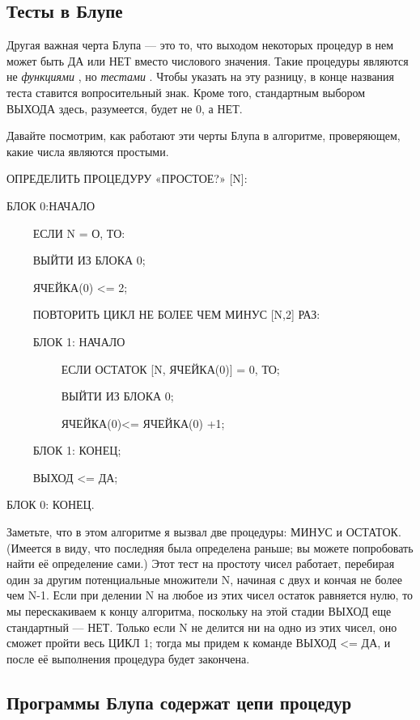 \documentclass[../main.tex]{subfiles}
\begin{document}
\subsection{Тесты в Блупе}

Другая важная черта Блупа --- это то, что выходом некоторых процедур в нем может быть ДА или НЕТ вместо числового значения. Такие процедуры являются не \emph{функциями} , но \emph{тестами} . Чтобы указать на эту разницу, в конце названия теста ставится вопросительный знак. Кроме того, стандартным выбором ВЫХОДА здесь, разумеется, будет не 0, а НЕТ.

Давайте посмотрим, как работают эти черты Блупа в алгоритме, проверяющем, какие числа являются простыми.

ОПРЕДЕЛИТЬ ПРОЦЕДУРУ «ПРОСТОЕ?» {[}N{]}:

БЛОК 0:НАЧАЛО

~~~~ ЕСЛИ N = О, ТО:

~~~~ ВЫЙТИ ИЗ БЛОКА 0;

~~~~ ЯЧЕЙКА(0) \textless= 2;

~~~~ ПОВТОРИТЬ ЦИКЛ НЕ БОЛЕЕ ЧЕМ МИНУС {[}N,2{]} РАЗ:

~~~~ БЛОК 1: НАЧАЛО

~~~~~~~~~ ЕСЛИ ОСТАТОК {[}N, ЯЧЕЙКА(0){]} = 0, ТО;

~~~~~~~~~ ВЫЙТИ ИЗ БЛОКА 0;

~~~~~~~~~ ЯЧЕЙКА(0)\textless= ЯЧЕЙКА(0) +1;

~~~~ БЛОК 1: КОНЕЦ;

~~~~ ВЫХОД \textless= ДА;

БЛОК 0: КОНЕЦ.

Заметьте, что в этом алгоритме я вызвал две процедуры: МИНУС и ОСТАТОК\@. (Имеется в виду, что последняя была определена раньше; вы можете попробовать найти её определение сами.) Этот тест на простоту чисел работает, перебирая один за другим потенциальные множители N, начиная с двух и кончая не более чем N-1. Если при делении N на любое из этих чисел остаток равняется нулю, то мы перескакиваем к концу алгоритма, поскольку на этой стадии ВЫХОД еще стандартный --- НЕТ\@. Только если N не делится ни на одно из этих чисел, оно сможет пройти весь ЦИКЛ 1; тогда мы придем к команде ВЫХОД \textless= ДА, и после её выполнения процедура будет закончена.


\subsection{Программы Блупа содержат цепи процедур}
\end{document}
